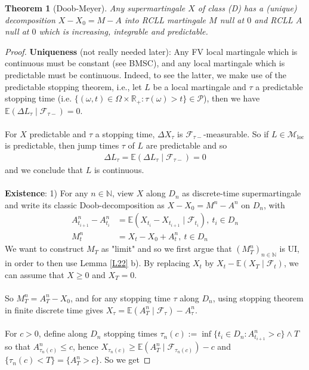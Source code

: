 \documentclass[12pt,a4paper, twoside]{article}
\newtheorem{thm}{Theorem}[section]
\theoremstyle{definition}
\newcommand{\EE}{\mathbb{E}} %
\begin{document}
\begin{thm}[Doob-Meyer] \label{T24} Any supermartingale $X$ of class (D) has a (unique) decomposition $X-X_0=M-A$ into RCLL martingale $M$ null at $0$ and RCLL $A$ null at $0$ which is increasing, integrable and predictable.
\end{thm}
\begin{proof} \textbf{Uniqueness} (not really needed later): Any FV local martingale which is continuous must be constant (see BMSC), and any local martingale which is predictable must be continuous. Indeed, to see the latter, we make use of the predictable stopping theorem, i.e., let $L$ be a local martingale and $\tau$ a predictable stopping time (i.e. $\{( \omega, t) \in \Omega \times \mathbb{R}_+ : \tau( \omega) >t \} \in \mathcal{P}$), then we have $\EE( \Delta L_\tau \mid \mathcal{F}_{\tau-})=0$. \\
\\
For $X$ predictable and $\tau$ a stopping time, $\Delta X_\tau$ is $\mathcal{F}_{\tau-}$-measurable. So if $L \in \mathcal{M}_\text{loc}$ is predictable, then jump times $\tau$ of $L$ are predictable and so 
\begin{align*}
\Delta L_\tau = \EE( \Delta L_\tau \mid \mathcal{F}_{\tau-})=0
\end{align*}
and we conclude that $L$ is continuous. 
\\
\\
\textbf{Existence}: 1) For any $n \in \mathbb{N}$, view $X$ along $D_n$ as discrete-time supermartingale and write its classic Doob-decomposition as $X-X_0=M^n-A^n$ on $D_n$, with 
\begin{align*}
A_{t_{i+1}}^n -A_{t_i}^n &= \EE( X_{t_i}-X_{t_{i+1}} \mid \mathcal{F}_{t_i}), \ t_i \in D_n \\
M_t^n &= X_t-X_0 + A_t^n, \ t  \in D_n
\end{align*}
We want to construct $M_T$ as "limit" and so we first argue that $(M_T^n)_{n \in \mathbb{N}}$ is UI, in order to then use Lemma \ref{L22} b). By replacing $X_t$ by $X_t- \EE(X_T \mid \mathcal{F}_t)$, we can assume that $X \geq 0$ and $X_T=0$. \\
\\
So $M_T^n = A_T^n -X_0$, and for any stopping time $\tau$ along $D_n$, using stopping theorem in finite discrete time gives $X_\tau = \EE(A_T^n \mid \mathcal{F}_\tau) - A_\tau^n$. 
\\\\
For $c>0$, define along $D_n$ stopping times $\tau_n(c):= \inf \{ t_i \in D_n : A_{t_{i+1}}^n > c \} \wedge T$ so that $A_{\tau_n(c)}^n \leq c$, hence $X_{\tau_n(c)} \geq \EE(A_T^n \mid \mathcal{F}_{\tau_n(c)}) -c$ and $\{ \tau_n(c) < T\} = \{ A_T^n > c\}$. So we get 

\end{proof}
\end{document}
